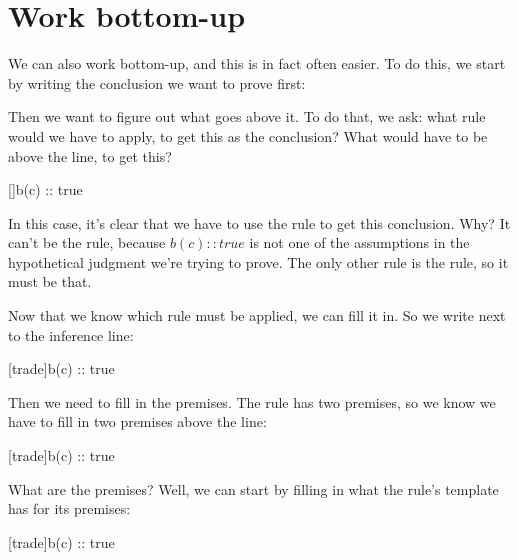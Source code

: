 \documentclass[../../../main.tex]{subfiles}
\begin{document}
\section{Work bottom-up}

We can also work bottom-up, and this is in fact often easier. To do this, we start by writing the conclusion we want to prove first:

\begin{prooftree*}
  \hypo{}
  \hypo{}
\end{prooftree*}

\noindent
Then we want to figure out what goes above it. To do that, we ask: what rule would we have to apply, to get this as the conclusion? What would have to be above the line, to get this?

\begin{prooftree*}
  \ellipsis{}{}
  []{b(c) :: true}
\end{prooftree*}

\noindent
In this case, it's clear that we have to use the  rule to get this conclusion. Why? It can't be the  rule, because $b(c) :: true$ is not one of the assumptions in the hypothetical judgment we're trying to prove. The only other rule is the  rule, so it must be that.

Now that we know which rule must be applied, we can fill it in. So we write  next to the inference line:

\begin{prooftree*}
  \hypo{}
  \hypo{}
  [trade]{b(c) :: true}
\end{prooftree*}

\noindent
Then we need to fill in the premises. The  rule has two premises, so we know we have to fill in two premises above the line:

\begin{prooftree*}
  [trade]{b(c) :: true}
\end{prooftree*}

\noindent
What are the premises? Well, we can start by filling in what the rule's template has for its premises:

\begin{prooftree*}
  [trade]{b(c) :: true}
\end{prooftree*}
\end{document}
